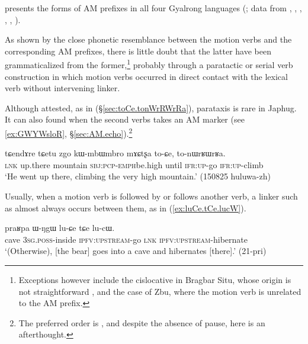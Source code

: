  presents the forms of AM prefixes in all four Gyalrong languages (\citealt{jacques20am-st}; data from \citealt{jacques13harmonization}, \citealt{gong18these}, \citealt{jackson14morpho}, \citealt{linyj16cogtse}, \citealt[200--204]{zhang16bragdbar}, \citealt[497--500]{prins16kyomkyo}). 

As shown by the close phonetic resemblance between the motion verbs and the corresponding AM prefixes, there is little doubt that the latter have been grammaticalized from the former,\footnote{Exceptions however include the cislocative  in Bragbar Situ, whose origin is not straightforward \citep{zhangshuya20these}, and the case of Zbu, where the motion verb  is unrelated to the AM prefix. } probably through a paratactic or serial verb construction in which motion verbs occurred in direct contact with the lexical verb without intervening linker. 

Although attested, as in (§\ref{sec:toCe.tonWrRWrRa}), parataxis is rare in Japhug. It can also found when the second verbs takes an AM marker (see \ref{ex:GWYWsloR}, §\ref{sec:AM.echo}).\footnote{The preferred order is , and despite the absence of pause,  here is an afterthought. }

\begin{exe}
 \ex  \label{sec:toCe.tonWrRWrRa}
\gll tɕendɤre tɕetu zgo kɯ-mbɯ\redp{}mbro mɤɕtʂa to-ɕe, to-nɯrʁɯrʁa. \\
\textsc{lnk} up.there mountain \textsc{sbj}:\textsc{pcp}-\textsc{emph}\redp{}be.high until \textsc{ifr}:\textsc{up}-go \textsc{ifr}:\textsc{up}-climb \\
\glt `He went up there, climbing the very high mountain.' (150825 huluwa-zh) 
\end{exe}

Usually, when a motion verb is followed by or follows another verb, a linker such as  almost always occurs between them, as in (\ref{ex:luCe.tCe.lucW}).

\begin{exe}
	\ex  \label{ex:luCe.tCe.lucW}
	\gll praʁpa ɯ-ŋgɯ lu-ɕe tɕe lu-cɯ. \\
	cave \textsc{3sg}.\textsc{poss}-inside \textsc{ipfv}:\textsc{upstream}-go \textsc{lnk} \textsc{ipfv}:\textsc{upstream}-hibernate \\
	\glt `(Otherwise), [the bear] goes into a cave and hibernates [there].' (21-pri)
\end{exe}

